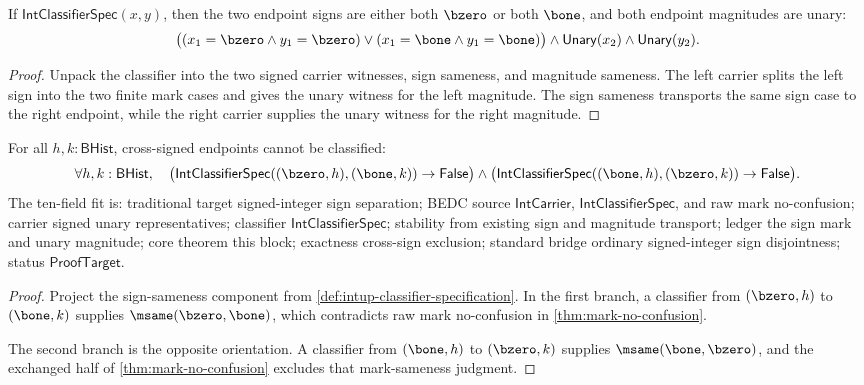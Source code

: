\begin{theorem}
\label{thm:int-classifier-endpoint-sign-cases}
If $\mathsf{IntClassifierSpec}(x,y)$, then the two endpoint signs are either
both $\bzero$ or both $\bone$, and both endpoint magnitudes are unary:
$$
\bigl((x_1=\bzero\wedge y_1=\bzero)\vee
(x_1=\bone\wedge y_1=\bone)\bigr)\wedge
\mathsf{Unary}(x_2)\wedge\mathsf{Unary}(y_2).
$$
\end{theorem}
\begin{proof}
Unpack the classifier into the two signed carrier witnesses, sign sameness,
and magnitude sameness. The left carrier splits the left sign into the two
finite mark cases and gives the unary witness for the left magnitude. The sign
sameness transports the same sign case to the right endpoint, while the right
carrier supplies the unary witness for the right magnitude.
\end{proof}

\begin{theorem}
\label{thm:int-classifier-cross-sign-exclusion}
For all $h,k:\mathsf{BHist}$, cross-signed endpoints cannot be classified:
$$
\forall h,k:\mathsf{BHist},\quad
\bigl(\mathsf{IntClassifierSpec}((\bzero,h),(\bone,k))\to\mathsf{False}\bigr)
\land
\bigl(\mathsf{IntClassifierSpec}((\bone,h),(\bzero,k))\to\mathsf{False}\bigr).
$$
The ten-field fit is: traditional target signed-integer sign separation; BEDC
source $\mathsf{IntCarrier}$, $\mathsf{IntClassifierSpec}$, and raw mark
no-confusion; carrier signed unary representatives; classifier
$\mathsf{IntClassifierSpec}$; stability from existing sign and magnitude
transport; ledger the sign mark and unary magnitude; core theorem this block;
exactness cross-sign exclusion; standard bridge ordinary signed-integer sign
disjointness; status $\mathsf{ProofTarget}$.
\end{theorem}
\begin{proof}
Project the sign-sameness component from
\autoref{def:intup-classifier-specification}. In the first branch, a classifier
from $(\bzero,h)$ to $(\bone,k)$ supplies $\msame(\bzero,\bone)$, which
contradicts raw mark no-confusion in \autoref{thm:mark-no-confusion}.

The second branch is the opposite orientation. A classifier from $(\bone,h)$ to
$(\bzero,k)$ supplies $\msame(\bone,\bzero)$, and the exchanged half of
\autoref{thm:mark-no-confusion} excludes that mark-sameness judgment.
\end{proof}

